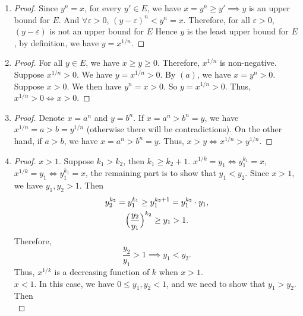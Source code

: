 \documentclass[12pt, letter]{article}
\begin{document}
\begin{enumerate}[label=(\alph*)]
\begin{proof}
        Thus, $y^n=x$.
    \end{proof}
    \item \begin{proof}
        Since $y^n=x$, for every $y'\in E$, we have $x=y^n\geq y'\implies y$ is an upper bound for $E$. And $\forall \varepsilon>0$, $(y-\varepsilon)^n<y^n=x$. Therefore, for all $\varepsilon>0$, $(y-\varepsilon)$ is not an upper bound for $E$
        Hence $y$ is the least upper bound for $E$, by definition, we have $y=x^{1/n}$.
    \end{proof}
    \item \begin{proof}
        For all $y\in E$, we have $x\geq y\geq 0$. Therefore, $x^{1/n}$ is non-negative. Suppose $x^{1/n}>0$. We have $y=x^{1/n}>0$. By $(a)$, we have $x=y^n>0$.
        Suppose $x>0$. We then have $y^n=x>0$. So $y=x^{1/n}>0$. Thus, $x^{1/n}>0\iff x>0$.
    \end{proof}
    \item \begin{proof}
        Denote $x=a^n$ and $y=b^n$. If $x=a^n>b^n=y$, we have $x^{1/n}=a>b=y^{1/n}$ (otherwise there will be contradictions). On the other hand, if $a>b$, we have $x=a^n>b^n=y$.
        Thus, $x>y\iff x^{1/n}>y^{1/n}$. 
    \end{proof}
    \item \begin{proof}
         $x>1$. Suppose $k_1>k_2$, then $k_1\geq k_2+1$. $x^{1/k}=y_1\iff y_1^{k_1}=x$, $x^{1/k}=y_1\iff y_1^{k_1}=x$, the remaining part is to show that $y_1<y_2$. Since $x>1$, we have $y_1,y_2>1$.
         Then 
         \begin{equation*}
            \begin{gathered}
                y_2^{k_2}=y_1^{k_1}\geq y_1^{k_2+1}=y_1^{k_2}\cdot y_1,\\
                \Bigl(\frac{y_2}{y_1}\Bigr)^{k_2}\geq y_1>1.
            \end{gathered}
         \end{equation*}
         Therefore, 
         \begin{equation*}
            \frac{y_2}{y_1}>1\implies y_1<y_2.
         \end{equation*}
         Thus, $x^{1/k}$ is a decreasing function of $k$ when $x>1$.  \\
         $x<1$. In this case, we have $0\leq y_1,y_2<1$, and we need to show that $y_1>y_2$. Then 
         \begin{equation*}

\end{equation*}
\end{proof}
\end{enumerate}
\end{document}
